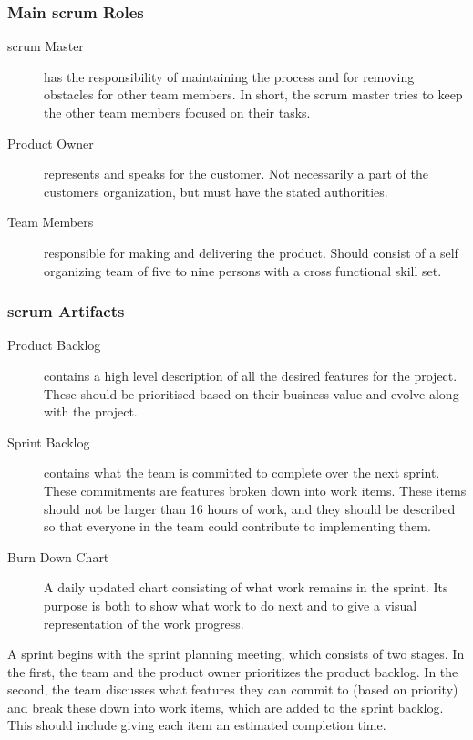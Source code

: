\subsubsection{Main \Gls{scrum} Roles}
\begin{description}
	\item[\Gls{scrum} Master] has the responsibility of maintaining the process and
		for removing obstacles for other team members. In short, the \Gls{scrum}
		master tries to keep the other team members focused on their tasks.
	\item[Product Owner] represents and speaks for the customer. Not
		necessarily a part of the customers organization, but must have the
		stated authorities.
	\item[Team Members] responsible for making and delivering the product.
		Should consist of a self organizing team of five to nine persons with
		a cross functional skill set.
\end{description}

\subsubsection{\Gls{scrum} Artifacts}
\begin{description}
	\item[Product Backlog] contains a high level description of all the desired
		features for the project. These should be prioritised based on their
		business value and evolve along with the project.
	\item[Sprint Backlog] contains what the team is committed to complete over
		the next sprint. These commitments are features broken down into work
		items. These items should not be larger than 16 hours of work, and they
		should be described so that everyone in the team could contribute to
		implementing them.
	\item[Burn Down Chart] A daily updated chart consisting of what work
		remains in the sprint. Its purpose is both to show what work to do next
		and to give a visual representation of the work progress.
\end{description}

A sprint begins with the sprint planning meeting, which consists of two
stages. In the first, the team and the product owner prioritizes the product
backlog. In the second, the team discusses what features they can commit to
(based on priority) and break these down into work items, which are added to
the sprint backlog. This should include giving each item an estimated
completion time.

